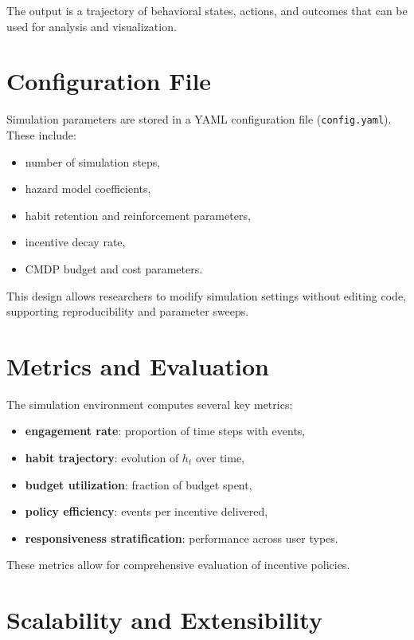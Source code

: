 The output is a trajectory of behavioral states, actions, and outcomes that can
be used for analysis and visualization.

\section{Configuration File}

Simulation parameters are stored in a YAML configuration file
(\texttt{config.yaml}). These include:

\begin{itemize}
    \item number of simulation steps,
    \item hazard model coefficients,
    \item habit retention and reinforcement parameters,
    \item incentive decay rate,
    \item CMDP budget and cost parameters.
\end{itemize}

This design allows researchers to modify simulation settings without editing
code, supporting reproducibility and parameter sweeps.

\section{Metrics and Evaluation}

The simulation environment computes several key metrics:

\begin{itemize}
    \item \textbf{engagement rate}: proportion of time steps with events,
    \item \textbf{habit trajectory}: evolution of $h_t$ over time,
    \item \textbf{budget utilization}: fraction of budget spent,
    \item \textbf{policy efficiency}: events per incentive delivered,
    \item \textbf{responsiveness stratification}: performance across user types.
\end{itemize}

These metrics allow for comprehensive evaluation of incentive policies.

\section{Scalability and Extensibility}

